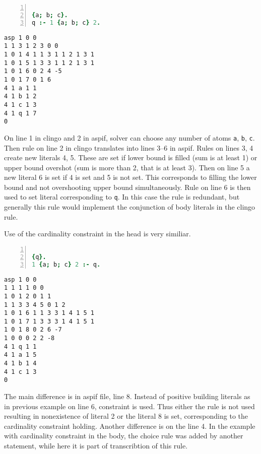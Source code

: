 \documentclass{fithesis}
\begin{document}
\begin{minipage}[t]{0.45\linewidth}
\centering
\begin{lstlisting}[language=prolog, numbers=left, countblanklines=false]

{a; b; c}.
q :- 1 {a; b; c} 2.
\end{lstlisting}
\end{minipage}
\hspace{1em}
\begin{minipage}[t]{0.45\linewidth}
\centering
\begin{lstlisting}[numbers=right, countblanklines=false]
asp 1 0 0
1 1 3 1 2 3 0 0
1 0 1 4 1 1 3 1 1 2 1 3 1
1 0 1 5 1 3 3 1 1 2 1 3 1
1 0 1 6 0 2 4 -5
1 0 1 7 0 1 6
4 1 a 1 1
4 1 b 1 2
4 1 c 1 3
4 1 q 1 7
0
\end{lstlisting}
\end{minipage}
On line 1 in clingo and 2 in aspif, solver can choose any number of atoms
\texttt{a}, \texttt{b}, \texttt{c}. Then rule on line 2 in clingo translates
into lines 3--6 in aspif. Rules on lines 3, 4 create new literals 4, 5. These
are set if lower bound is filled (sum is at least 1) or upper bound overshot
(sum is more than 2, that is at least 3). Then on line 5
a new literal 6 is set if 4 is set and 5 is not set. This corresponds
to filling the lower bound and not overshooting upper bound simultaneously.
Rule on line 6 is then used to set literal corresponding to \texttt{q}.
In this case the rule is redundant, but generally this rule would implement
the conjunction of body literals in the clingo rule.

Use of the cardinality constraint in the head is very similiar.

\begin{minipage}[t]{0.45\linewidth}
\centering
\begin{lstlisting}[language=prolog, numbers=left, countblanklines=false]

{q}.
1 {a; b; c} 2 :- q.
\end{lstlisting}
\end{minipage}
\hspace{1em}
\begin{minipage}[t]{0.45\linewidth}
\centering
\begin{lstlisting}[numbers=right, countblanklines=false]
asp 1 0 0
1 1 1 1 0 0
1 0 1 2 0 1 1
1 1 3 3 4 5 0 1 2
1 0 1 6 1 1 3 3 1 4 1 5 1
1 0 1 7 1 3 3 3 1 4 1 5 1
1 0 1 8 0 2 6 -7
1 0 0 0 2 2 -8
4 1 q 1 1
4 1 a 1 5
4 1 b 1 4
4 1 c 1 3
0
\end{lstlisting}
\end{minipage}
The main difference is in aspif file, line 8. Instead of positive building
literals as in previous example on line 6, constraint is used. Thus either the
rule is not used resulting in nonexistence of literal 2 or the literal 8
is set, corresponding to the cardinality constraint holding.
Another difference is on the line 4. In the example with cardinality constraint
in the body, the choice rule was added by another statement, while here it is
part of transcribtion of this rule.
\end{document}
